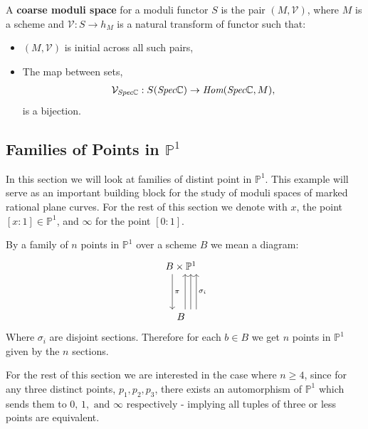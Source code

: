 \begin{definition}
    A \textbf{coarse moduli space} for a moduli functor $S$ is the pair $(M, \mathcal{V})$, where $M$ is a scheme and $\mathcal{V}:S \to h_{M}$ is a natural transform of functor such that:
    \begin{itemize}
        \item $(M,\mathcal{V})$ is initial across all such pairs,
        \item The map between sets, 
            \begin{align*}
                \mathcal{V}_{\emph{Spec}\mathbb{C}}: S(\emph{Spec}\mathbb{C}) \to \emph{Hom}(\emph{Spec}\mathbb{C}, M),
            \end{align*}
            is a bijection.
    \end{itemize}
\end{definition}
\subsection{Families of Points in $\mathbb{P}^{1}$}
In this section we will look at families of distint point in $\mathbb{P}^{1}$. 
This example will serve as an important building block for the study of moduli spaces of marked rational plane curves. 
For the rest of this section we denote with $x$, the point $[x:1] \in \mathbb{P}^{1}$, and $\infty$ for the point $[0:1]$.
\par By a family of $n$ points in $\mathbb{P}^{1}$ over a scheme $B$ we mean a diagram:
\[
    \begin{tikzcd}
        B \times \mathbb{P}^{1}\\
        \\
        B
        \arrow["\pi",xshift = -2ex, from = 1-1, to = 3-1]
        \arrow[ xshift = 1ex,from = 3-1, to = 1-1]
        \arrow[ xshift = 2.3ex,from = 3-1, to = 1-1]
        \arrow[ swap, "\sigma_{i}", xshift = 3.6ex,from = 3-1, to = 1-1]
    \end{tikzcd}
\]
Where $\sigma_{i}$ are disjoint sections. Therefore for each $b \in B$ we get $n$ points in $\mathbb{P}^{1}$ given by the $n$ sections. 
\par For the rest of this section we are interested in the case where $n \geq 4$, since for any three distinct points, $p_{1}, p_{2}, p_{3}$, there exists an automorphism of $\mathbb{P}^{1}$ which sends them to $0,\,1,\text{ and }\infty$ respectively - implying all tuples of three or less points are equivalent.

